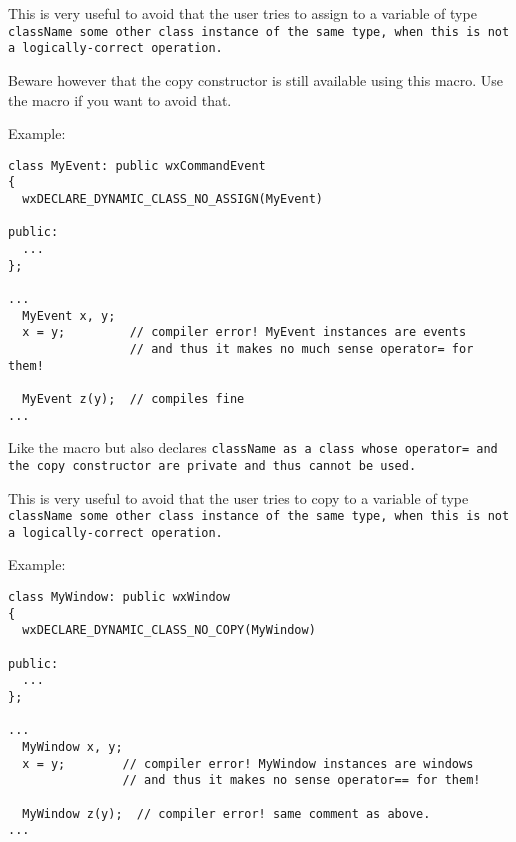 This is very useful to avoid that the user tries to assign to a variable 
of type \tt{className} some other class instance of the same type, when
this is not a logically-correct operation.

Beware however that the copy constructor is still available using this macro.
Use the  
macro if you want to avoid that.

Example:

\begin{verbatim}
class MyEvent: public wxCommandEvent
{
  wxDECLARE_DYNAMIC_CLASS_NO_ASSIGN(MyEvent)

public:
  ...
};

...
  MyEvent x, y;
  x = y;         // compiler error! MyEvent instances are events
                 // and thus it makes no much sense operator= for them!
                
  MyEvent z(y);  // compiles fine
...

\end{verbatim}


\label{wxdeclaredynamicclassnocopy}


Like the 
macro but also declares \tt{className} as a class whose \tt{operator=} 
and the copy constructor are private and thus cannot be used. 

This is very useful to avoid that the user tries to copy to a variable 
of type \tt{className} some other class instance of the same type, when
this is not a logically-correct operation.

Example:

\begin{verbatim}
class MyWindow: public wxWindow
{
  wxDECLARE_DYNAMIC_CLASS_NO_COPY(MyWindow)

public:
  ...
};

...
  MyWindow x, y;
  x = y;        // compiler error! MyWindow instances are windows
                // and thus it makes no sense operator== for them!
                
  MyWindow z(y);  // compiler error! same comment as above.
...

\end{verbatim}



\label{wximplementabstractclass}

